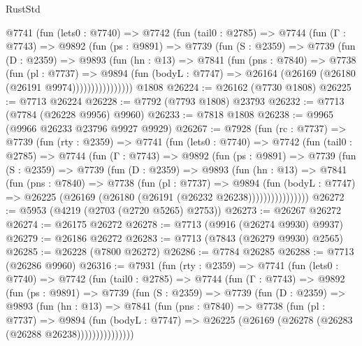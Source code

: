 \begin{lexlean}{RustStd}
\begin{coremodule}
        @7741
          (fun (lets0 : @7740) =>
          @7742
            (fun (tail0 : @2785) =>
            @7744
              (fun (Γ : @7743) =>
              @9892
                (fun (ps : @9891) =>
                @7739
                  (fun (S : @2359) =>
                  @7739
                    (fun (D : @2359) =>
                    @9893
                      (fun (hn : @13) =>
                      @7841
                        (fun (pns : @7840) =>
                        @7738
                          (fun (pl : @7737) =>
                          @9894
                            (fun (bodyL : @7747) =>
                            @26164 (@26169 (@26180 (@26191 @9974))))))))))))))))
    @1808
@26224 := @26162 (@7730 @1808)
@26225 := @7713 @26224
@26228 := @7792 (@7793 @1808) @23793
@26232 := @7713 (@7784 (@26228 @9956) @9960)
@26233 := @7818 @1808
@26238 := @9965 (@9966 @26233 @23796 @9927 @9929)
@26267 := @7928
    (fun (rc : @7737) =>
    @7739
      (fun (rty : @2359) =>
      @7741
        (fun (lets0 : @7740) =>
        @7742
          (fun (tail0 : @2785) =>
          @7744
            (fun (Γ : @7743) =>
            @9892
              (fun (ps : @9891) =>
              @7739
                (fun (S : @2359) =>
                @7739
                  (fun (D : @2359) =>
                  @9893
                    (fun (hn : @13) =>
                    @7841
                      (fun (pns : @7840) =>
                      @7738
                        (fun (pl : @7737) =>
                        @9894
                          (fun (bodyL : @7747) =>
                          @26225 (@26169 (@26180 (@26191 (@26232 @26238))))))))))))))))
@26272 := @5953 (@4219 (@2703 (@2720 @5265) @2753))
@26273 := @26267 @26272
@26274 := @26175 @26272
@26278 := @7713 (@9916 (@26274 @9930) @9937)
@26279 := @26186 @26272
@26283 := @7713 (@7843 (@26279 @9930) @2565)
@26285 := @26228 (@7800 @26272)
@26286 := @7784 @26285
@26288 := @7713 (@26286 @9960)
@26316 := @7931
    (fun (rty : @2359) =>
    @7741
      (fun (lets0 : @7740) =>
      @7742
        (fun (tail0 : @2785) =>
        @7744
          (fun (Γ : @7743) =>
          @9892
            (fun (ps : @9891) =>
            @7739
              (fun (S : @2359) =>
              @7739
                (fun (D : @2359) =>
                @9893
                  (fun (hn : @13) =>
                  @7841
                    (fun (pns : @7840) =>
                    @7738
                      (fun (pl : @7737) =>
                      @9894
                        (fun (bodyL : @7747) =>
                        @26225 (@26169 (@26278 (@26283 (@26288 @26238)))))))))))))))

\end{coremodule}
\end{lexlean}
